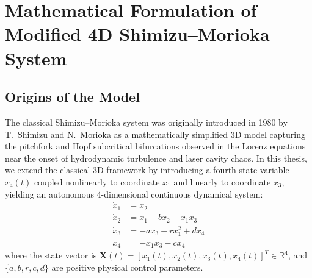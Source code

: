 \documentclass[12pt,a4paper,oneside]{report}
\begin{document}
\chapter{Mathematical Formulation of Modified 4D Shimizu--Morioka System}

\section{Origins of the Model}
The classical Shimizu--Morioka system was originally introduced in 1980 by T.~Shimizu and N.~Morioka as a mathematically simplified 3D model capturing the pitchfork and Hopf subcritical bifurcations observed in the Lorenz equations near the onset of hydrodynamic turbulence and laser cavity chaos. In this thesis, we extend the classical 3D framework by introducing a fourth state variable $x_4(t)$ coupled nonlinearly to coordinate $x_1$ and linearly to coordinate $x_3$, yielding an autonomous 4-dimensional continuous dynamical system:
\begin{align}
    \dot{x}_1 &= x_2 \label{eq:sm1} \\
    \dot{x}_2 &= x_1 - b x_2 - x_1 x_3 \label{eq:sm2} \\
    \dot{x}_3 &= -a x_3 + r x_1^2 + d x_4 \label{eq:sm3} \\
    \dot{x}_4 &= -x_1 x_3 - c x_4 \label{eq:sm4}
\end{align}
where the state vector is $\mathbf{X}(t) = [x_1(t), x_2(t), x_3(t), x_4(t)]^T \in \mathbb{R}^4$, and $\{a, b, r, c, d\}$ are positive physical control parameters.
\end{document}
